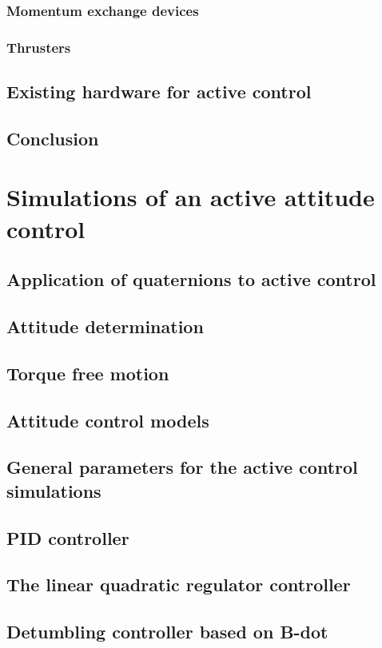 \documentclass[10pt]{article}
\begin{document}
\subsubsection{Momentum exchange devices}
\subsubsection{Thrusters}
\subsection{Existing hardware for active control }
\subsection{Conclusion}
\section{Simulations of an active attitude control}
\subsection{Application of quaternions to active control}
\subsection{Attitude determination}
\subsection{Torque free motion}
\subsection{Attitude control models}
\subsection{General parameters for the active control simulations}
\subsection{PID controller}
\subsection{The linear quadratic regulator controller}
\subsection{Detumbling controller based on B-dot}
\end{document}
